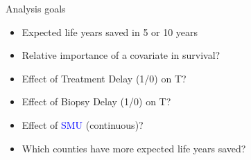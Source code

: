 \documentclass{beamer}
\begin{document}
\begin{frame}{Analysis goals}

\begin{itemize}
   \vfill \item Expected life years saved in 5 or 10 years
    \vfill \item  Relative importance of a covariate in survival?
    \vfill \item Effect of Treatment Delay (1/0) on T?
    \vfill \item Effect of Biopsy Delay (1/0) on T?
    \vfill \item  Effect of \textcolor{blue}{SMU} (continuous)?
    \vfill \item  Which counties have more expected life years saved?
\end{itemize}

\end{frame}
\end{document}
